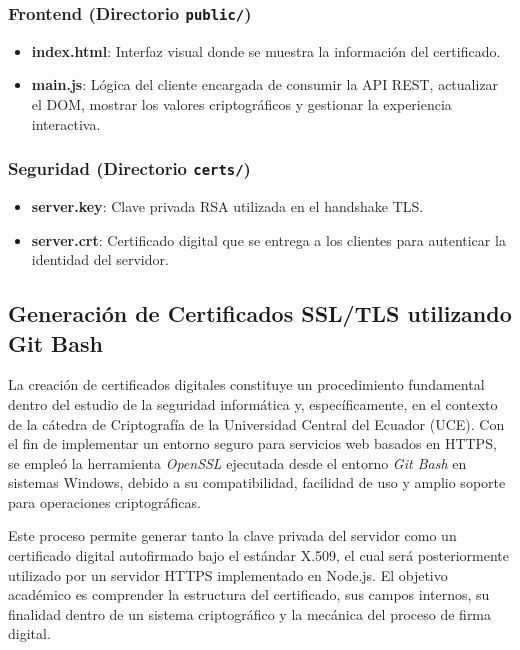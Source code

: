 \subsubsection*{Frontend (Directorio \texttt{public/})}

\begin{itemize}
    \item \textbf{index.html}: Interfaz visual donde se muestra la información del certificado.
    \item \textbf{main.js}: Lógica del cliente encargada de consumir la API REST, actualizar el DOM, mostrar los valores criptográficos y gestionar la experiencia interactiva.
\end{itemize}

\subsubsection*{Seguridad (Directorio \texttt{certs/})}

\begin{itemize}
    \item \textbf{server.key}: Clave privada RSA utilizada en el handshake TLS.
    \item \textbf{server.crt}: Certificado digital que se entrega a los clientes para autenticar la identidad del servidor.
\end{itemize}

\subsection{Generación de Certificados SSL/TLS utilizando Git Bash}

La creación de certificados digitales constituye un procedimiento fundamental dentro del estudio de la seguridad informática y, específicamente, en el contexto de la cátedra de Criptografía de la Universidad Central del Ecuador (UCE). Con el fin de implementar un entorno seguro para servicios web basados en HTTPS, se empleó la herramienta \textit{OpenSSL} ejecutada desde el entorno \textit{Git Bash} en sistemas Windows, debido a su compatibilidad, facilidad de uso y amplio soporte para operaciones criptográficas.

Este proceso permite generar tanto la clave privada del servidor como un certificado digital autofirmado bajo el estándar X.509, el cual será posteriormente utilizado por un servidor HTTPS implementado en Node.js. El objetivo académico es comprender la estructura del certificado, sus campos internos, su finalidad dentro de un sistema criptográfico y la mecánica del proceso de firma digital.


